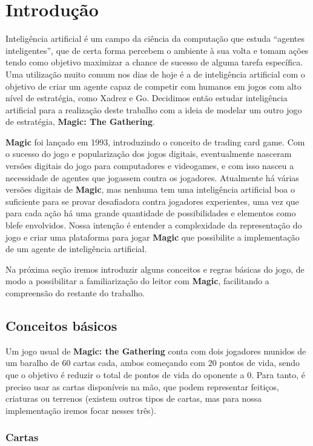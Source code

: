 \chapter{Introdução}

Inteligência artificial é um campo da ciência da computação que estuda
``agentes inteligentes'', que de certa forma percebem o ambiente à sua volta
e tomam ações tendo como objetivo maximizar a chance de sucesso de alguma
tarefa específica. Uma utilização muito comum nos dias de hoje é a de
inteligência artificial com o objetivo de criar um agente capaz de competir
com humanos em jogos com alto nível de estratégia, como Xadrez e Go.
Decidimos então estudar inteligência artificial para a realização deste
trabalho com a ideia de modelar um outro jogo de estratégia,
\textbf{Magic: The Gathering}.

\textbf{Magic} foi lançado em 1993, introduzindo o conceito de trading card
game. Com o sucesso do jogo e popularização dos jogos digitais, eventualmente
nasceram versões digitais do jogo para computadores e videogames, e com isso
nasceu a necessidade de agentes que jogassem contra os jogadores. Atualmente
há várias versões digitais de \textbf{Magic}, mas nenhuma tem uma inteligência artificial
boa o suficiente para se provar desafiadora contra jogadores experientes, uma vez
que para cada ação há uma grande quantidade de possibilidades e elementos como
blefe envolvidos. Nossa intenção é entender a complexidade da representação do
jogo e criar uma plataforma para jogar \textbf{Magic} que possibilite a implementação de
um agente de inteligência artificial.

Na próxima seção iremos introduzir alguns conceitos e regras básicas do jogo,
de modo a possibilitar a familiarização do leitor com \textbf{Magic}, facilitando
a compreensão do restante do trabalho.

\section{Conceitos básicos}
Um jogo usual de \textbf{Magic: the Gathering} conta com dois jogadores munidos
de um baralho de 60 cartas cada, ambos começando com 20 pontos de vida, sendo
que o objetivo é reduzir o total de pontos de vida do oponente a 0. Para tanto,
é preciso usar as cartas disponíveis na mão, que podem representar feitiços,
criaturas ou terrenos (existem outros tipos de cartas, mas para nossa implementação
iremos focar nesses três).

\subsection{Cartas}


